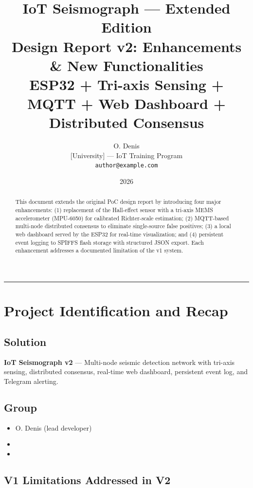 \documentclass[11pt,a4paper]{article}
\title{
  \vspace{-1cm}
  \textbf{\Large IoT Seismograph — Extended Edition} \\[0.4em]
  \large Design Report v2: Enhancements \& New Functionalities \\[0.2em]
  \normalsize ESP32 + Tri-axis Sensing + MQTT + Web Dashboard + Distributed Consensus
}
\author{O. Denis \\ \small [University] — IoT Training Program \\ \small \texttt{author@example.com}}
\date{2026}
\begin{document}
\maketitle
\thispagestyle{fancy}

\begin{abstract}
This document extends the original PoC design report by introducing four major enhancements: (1) replacement of the Hall-effect sensor with a tri-axis MEMS accelerometer (MPU-6050) for calibrated Richter-scale estimation; (2) MQTT-based multi-node distributed consensus to eliminate single-source false positives; (3) a local web dashboard served by the ESP32 for real-time visualization; and (4) persistent event logging to SPIFFS flash storage with structured JSON export. Each enhancement addresses a documented limitation of the v1 system.
\end{abstract}

\tableofcontents
\vspace{1em}
\hrule
\vspace{1em}

\section{Project Identification and Recap}

\subsection{Solution}
\textbf{IoT Seismograph v2} — Multi-node seismic detection network with tri-axis sensing, distributed consensus, real-time web dashboard, persistent event log, and Telegram alerting.

\subsection{Group}
\begin{itemize}[noitemsep]
  \item O. Denis (lead developer)
  \item [Member 2]
  \item [Member 3]
\end{itemize}

\subsection{V1 Limitations Addressed in V2}
\end{document}

